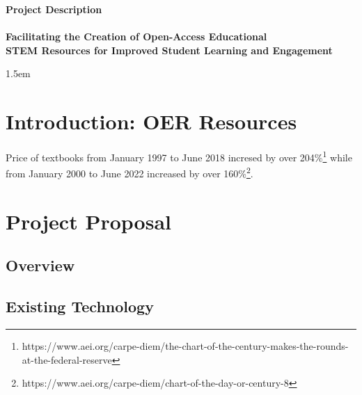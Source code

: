 \documentclass[11pt]{article}
\theoremstyle{theorem}
\theoremstyle{definition}
\begin{document}
\begin{center}
\textbf{\Large Project Description}\\[0.25cm]
\hrulefill\\[0.5cm]
\textbf{\Large Facilitating the Creation of Open-Access Educational \\[0.25cm] STEM Resources for Improved Student Learning and Engagement}\\
\hrulefill
\end{center}
\baselineskip 1.5em

\section{Introduction: OER Resources}
Price of textbooks from January 1997 to June 2018 incresed by over 204\%\footnote{https://www.aei.org/carpe-diem/the-chart-of-the-century-makes-the-rounds-at-the-federal-reserve} while from January 2000 to June 2022 increased by over 160\%\footnote{https://www.aei.org/carpe-diem/chart-of-the-day-or-century-8}.  

\section{Project Proposal}



\subsection{Overview}

\subsection{Existing Technology}
\end{document}
